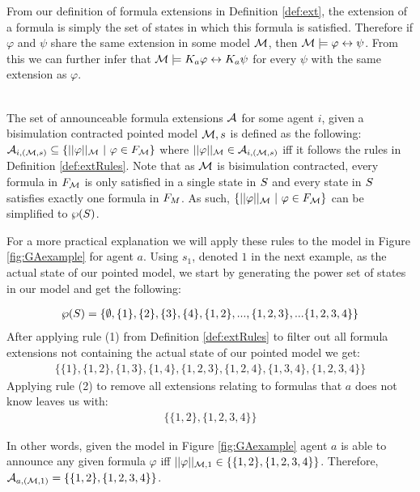 From our definition of formula extensions in Definition \ref{def:ext}, the extension of a formula is simply the set of states in which this formula is satisfied. Therefore if $\varphi$ and $\psi$ share the same extension in some model $\mathcal{M}$, then $\mathcal{M}\models\varphi \leftrightarrow \psi$. From this we can further infer that $\mathcal{M}\models K_a\varphi \leftrightarrow K_a\psi$ for every $\psi$ with the same extension as $\varphi$.


\begin{definition}\hfill\\
	\label{def:annexts}
	The set of announceable formula extensions $\mathcal{A}_{}$ for some agent $i$, given a bisimulation contracted pointed model $\mathcal{M},s$ is defined as the following: \\
	$\mathcal{A}_{i,(\mathcal{M},s)} \subseteq \{||\varphi||_{\mathcal{M}} ~|~ \varphi\in F_{\mathcal{M}}\}$ where $||\varphi||_{\mathcal{M}} \in 		     
	\mathcal{A}_{i,(\mathcal{M},s)}$ iff it follows the rules in Definition \ref{def:extRules}.
	Note that as $\mathcal{M}$ is bisimulation contracted, every formula in $F_{\mathcal{M}}$ is only satisfied in a single state in $S$ and every state in $S$ satisfies exactly one formula in $F_{M}$. As such, $\{||\varphi||_{\mathcal{M}} ~|~ \varphi \in F_{\mathcal{M}}\}$ can be simplified to $\wp(S)$.
\end{definition}

For a more practical explanation we will apply these rules to the model in Figure \ref{fig:GAexample} for agent $a$. Using $s_1$, denoted $1$ in the next example, as the actual state of our pointed model, we start by generating the power set of states in our model and get the following:

\begin{align*}
	\wp(S) = \{\emptyset,\{1\},\{2\},\{3\},\{4\},\{1,2\},...,\{1,2,3\},...\{1,2,3,4\}\}
\end{align*}
After applying rule (1) from Definition \ref{def:extRules}	to filter out all formula extensions not containing the actual state of our pointed model we get:
\begin{align*}
	\{\{1\},\{1,2\},\{1,3\},\{1,4\},\{1,2,3\},\{1,2,4\},\{1,3,4\},\{1,2,3,4\}\}
\end{align*}
Applying rule (2) to remove all extensions relating to formulas that $a$ does not know leaves us with:
\begin{align*}
	\{\{1,2\},\{1,2,3,4\}\}
\end{align*}

In other words, given the model in Figure \ref{fig:GAexample} agent $a$ is able to announce any given formula $\varphi$ iff $||\varphi||_{\mathcal{M},1} \in \{\{1,2\},\{1,2,3,4\}\}$. Therefore, $\mathcal{A}_{a,(\mathcal{M},1)} = \{\{1,2\},\{1,2,3,4\}\}$.

